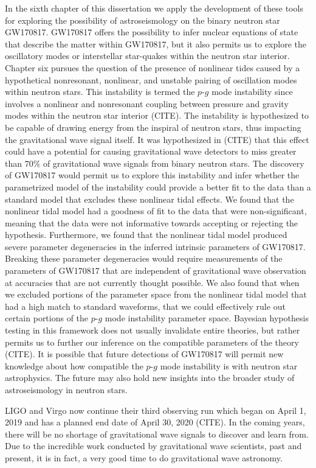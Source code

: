 In the sixth chapter of this dissertation we apply the development of these tools for exploring the possibility of astroseismology on the binary neutron star GW170817. GW170817 offers the possibility to infer nuclear equations of state that describe the matter within GW170817, but it also permits us to explore the oscillatory modes or interstellar star-quakes within the neutron star interior. Chapter six pursues the question of the presence of nonlinear tides caused by a hypothetical nonresonant, nonlinear, and unstable pairing of oscillation modes within neutron stars. This instability is termed the $p$-$g$ mode instability since involves a nonlinear and nonresonant coupling between pressure and gravity modes within the neutron star interior (CITE). The instability is hypothesized to be capable of drawing energy from the inspiral of neutron stars, thus impacting the gravitational wave signal itself. It was hypothesized in (CITE) that this effect could have a potential for causing gravitational wave detectors to miss greater than $70 \%$ of gravitational wave signals from binary neutron stars. The discovery of GW170817 would permit us to explore this instability and infer whether the parametrized model of the instability could provide a better fit to the data than a standard model that excludes these nonlinear tidal effects. We found that the nonlinear tidal model had a goodness of fit to the data that were non-significant, meaning that the data were not informative towards accepting or rejecting the hypothesis. Furthermore, we found that the nonlinear tidal model produced severe parameter degeneracies in the inferred intrinsic parameters of GW170817. Breaking these parameter degeneracies would require measurements of the parameters of GW170817 that are independent of gravitational wave observation at accuracies that are not currently thought possible. We also found that when we excluded portions of the parameter space from the nonlinear tidal model that had a high match to standard waveforms, that we could effectively rule out certain portions of the $p$-$g$ mode instability parameter space. Bayesian hypothesis testing in this framework does not usually invalidate entire theories, but rather permits us to further our inference on the compatible parameters of the theory (CITE). It is possible that future detections of GW170817 will permit new knowledge about how compatible the $p$-$g$ mode instability is with neutron star astrophysics. The future may also hold new insights into the broader study of astroseismology in neutron stars.

LIGO and Virgo now continue their third observing run which began on April 1, 2019 and has a planned end date of April 30, 2020 (CITE). In the coming years, there will be no shortage of gravitational wave signals to discover and learn from. Due to the incredible work conducted by gravitational wave scientists, past and present, it is in fact, a very good time to do gravitational wave astronomy.
